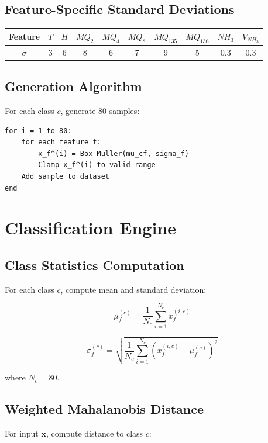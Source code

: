 \documentclass[10pt]{article}
\begin{document}
\subsection{Feature-Specific Standard Deviations}

\begin{table}[H]
\centering
\begin{tabular}{|c|c|c|c|c|c|c|c|c|c|}
\hline
\textbf{Feature} & $T$ & $H$ & $MQ_2$ & $MQ_4$ & $MQ_8$ & $MQ_{135}$ & $MQ_{136}$ & $NH_3$ & $V_{NH_3}$ \\
\hline
$\sigma$ & 3 & 6 & 8 & 6 & 7 & 9 & 5 & 0.3 & 0.3 \\
\hline
\end{tabular}
\end{table}

\subsection{Generation Algorithm}

For each class $c$, generate 80 samples:

\begin{verbatim}
for i = 1 to 80:
    for each feature f:
        x_f^(i) = Box-Muller(mu_cf, sigma_f)
        Clamp x_f^(i) to valid range
    Add sample to dataset
end
\end{verbatim}

\section{Classification Engine}

\subsection{Class Statistics Computation}

For each class $c$, compute mean and standard deviation:

\[
\mu_f^{(c)} = \frac{1}{N_c} \sum_{i=1}^{N_c} x_f^{(i,c)}
\]

\[
\sigma_f^{(c)} = \sqrt{\frac{1}{N_c} \sum_{i=1}^{N_c} (x_f^{(i,c)} - \mu_f^{(c)})^2}
\]

where $N_c = 80$.

\subsection{Weighted Mahalanobis Distance}

For input $\mathbf{x}$, compute distance to class $c$:
\end{document}

